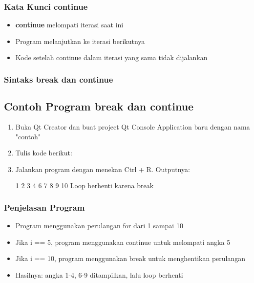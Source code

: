 \subsubsection{Kata Kunci continue}

\begin{itemize}
\item \textbf{continue} melompati iterasi saat ini
\item Program melanjutkan ke iterasi berikutnya
\item Kode setelah continue dalam iterasi yang sama tidak dijalankan
\end{itemize}

\subsubsection{Sintaks break dan continue}



\subsection{Contoh Program break dan continue}

\begin{enumerate}
\item Buka Qt Creator dan buat project Qt Console Application baru dengan nama "contoh"
\item Tulis kode berikut:



\item Jalankan program dengan menekan Ctrl + R. Outputnya:

\begin{lcverbatim}
1 2 3 4 6 7 8 9 10
Loop berhenti karena break
\end{lcverbatim}
\end{enumerate}

\subsubsection*{Penjelasan Program}
\begin{itemize}
\item Program menggunakan perulangan for dari 1 sampai 10
\item Jika i == 5, program menggunakan continue untuk melompati angka 5
\item Jika i == 10, program menggunakan break untuk menghentikan perulangan
\item Hasilnya: angka 1-4, 6-9 ditampilkan, lalu loop berhenti
\end{itemize}

